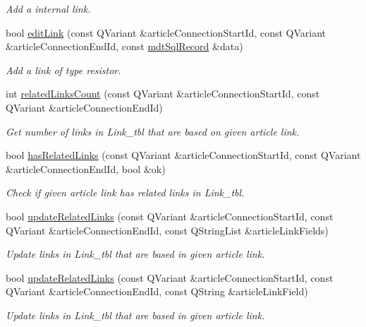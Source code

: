 \begin{DoxyCompactItemize}
\begin{DoxyCompactList}\small\item\em Add a internal link. \end{DoxyCompactList}\item 
bool \hyperlink{classmdt_cl_article_a3c627720a87e6003bb78c0727ec2ba64}{edit\-Link} (const Q\-Variant \&article\-Connection\-Start\-Id, const Q\-Variant \&article\-Connection\-End\-Id, const \hyperlink{classmdt_sql_record}{mdt\-Sql\-Record} \&data)
\begin{DoxyCompactList}\small\item\em Add a link of type resistor. \end{DoxyCompactList}\item 
int \hyperlink{classmdt_cl_article_af83dc77889605f6d7b94685ead4aa0f4}{related\-Links\-Count} (const Q\-Variant \&article\-Connection\-Start\-Id, const Q\-Variant \&article\-Connection\-End\-Id)
\begin{DoxyCompactList}\small\item\em Get number of links in Link\-\_\-tbl that are based on given article link. \end{DoxyCompactList}\item 
bool \hyperlink{classmdt_cl_article_a4e3200a4d584fde5754a4c23921f0d57}{has\-Related\-Links} (const Q\-Variant \&article\-Connection\-Start\-Id, const Q\-Variant \&article\-Connection\-End\-Id, bool \&ok)
\begin{DoxyCompactList}\small\item\em Check if given article link has related links in Link\-\_\-tbl. \end{DoxyCompactList}\item 
bool \hyperlink{classmdt_cl_article_a036a1369622d950f41451324123c5537}{update\-Related\-Links} (const Q\-Variant \&article\-Connection\-Start\-Id, const Q\-Variant \&article\-Connection\-End\-Id, const Q\-String\-List \&article\-Link\-Fields)
\begin{DoxyCompactList}\small\item\em Update links in Link\-\_\-tbl that are based in given article link. \end{DoxyCompactList}\item 
bool \hyperlink{classmdt_cl_article_a3fcb1469dd2761656dde65d54de4540e}{update\-Related\-Links} (const Q\-Variant \&article\-Connection\-Start\-Id, const Q\-Variant \&article\-Connection\-End\-Id, const Q\-String \&article\-Link\-Field)
\begin{DoxyCompactList}\small\item\em Update links in Link\-\_\-tbl that are based in given article link. \end{DoxyCompactList}\item 

\end{DoxyCompactItemize}
